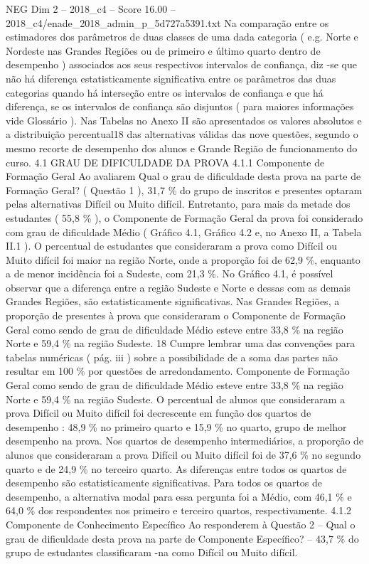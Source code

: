 \begin{textsample}{NEG Dim 2 – 2018\_c4 – Score 16.00 – 2018\_c4/enade\_2018\_admin\_p\_5d727a5391.txt}
Na comparação entre os estimadores dos parâmetros de duas classes de uma dada categoria ( e.g.
Norte e Nordeste nas Grandes Regiões ou de primeiro e último quarto dentro de desempenho ) associados aos seus respectivos intervalos de confiança, diz -se que não há diferença estatisticamente significativa entre os parâmetros das duas categorias quando há interseção entre os intervalos de confiança e que há diferença, se os intervalos de confiança são disjuntos ( para maiores informações vide Glossário ).
Nas Tabelas no Anexo II são apresentados os valores absolutos e a distribuição percentual18 das alternativas válidas das nove questões, segundo o mesmo recorte de desempenho dos alunos e Grande Região de funcionamento do curso. 4.1 GRAU DE DIFICULDADE DA PROVA 4.1.1 Componente de Formação Geral Ao avaliarem Qual o grau de dificuldade desta prova na parte de Formação Geral? ( Questão 1 ), 31,7 \% do grupo de inscritos e presentes optaram pelas alternativas Difícil ou Muito difícil.
Entretanto, para mais da metade dos estudantes ( 55,8 \% ), o Componente de Formação Geral da prova foi considerado com grau de dificuldade Médio ( Gráfico 4.1, Gráfico 4.2 e, no Anexo II, a Tabela II.1 ).
O percentual de estudantes que consideraram a prova como Difícil ou Muito difícil foi maior na região Norte, onde a proporção foi de 62,9 \%, enquanto a de menor incidência foi a Sudeste, com 21,3 \%.
No Gráfico 4.1, é possível observar que a diferença entre a região Sudeste e Norte e dessas com as demais Grandes Regiões, são estatisticamente significativas.
Nas Grandes Regiões, a proporção de presentes à prova que consideraram o Componente de Formação Geral como sendo de grau de dificuldade Médio esteve entre 33,8 \% na região Norte e 59,4 \% na região Sudeste. 18 Cumpre lembrar uma das convenções para tabelas numéricas ( pág. iii ) sobre a possibilidade de a soma das partes não resultar em 100 \% por questões de arredondamento.
Componente de Formação Geral como sendo de grau de dificuldade Médio esteve entre 33,8 \% na região Norte e 59,4 \% na região Sudeste.
O percentual de alunos que consideraram a prova Difícil ou Muito difícil foi decrescente em função dos quartos de desempenho : 48,9 \% no primeiro quarto e 15,9 \% no quarto, grupo de melhor desempenho na prova.
Nos quartos de desempenho intermediários, a proporção de alunos que consideraram a prova Difícil ou Muito difícil foi de 37,6 \% no segundo quarto e de 24,9 \% no terceiro quarto.
As diferenças entre todos os quartos de desempenho são estatisticamente significativas.
Para todos os quartos de desempenho, a alternativa modal para essa pergunta foi a Médio, com 46,1 \% e 64,0 \% dos respondentes nos primeiro e terceiro quartos, respectivamente. 4.1.2 Componente de Conhecimento Específico Ao responderem à Questão 2 – Qual o grau de dificuldade desta prova na parte de Componente Específico? – 43,7 \% do grupo de estudantes classificaram -na como Difícil ou Muito difícil.

\end{textsample}
